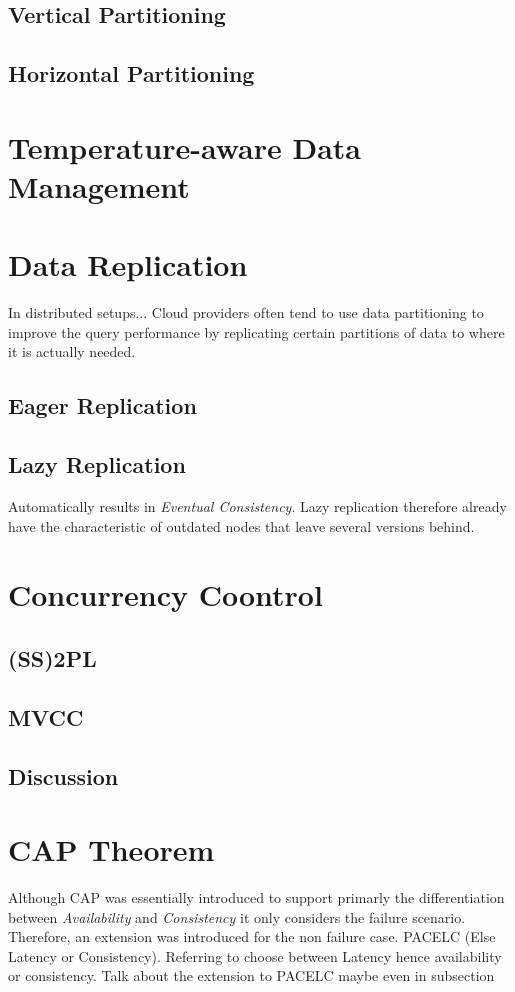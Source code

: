\subsection{Vertical Partitioning}
\subsection{Horizontal Partitioning}

\section{Temperature-aware Data Management}

\section{Data Replication}
In distributed setups...
Cloud providers often tend to use data partitioning to improve the query performance
by replicating certain partitions of data to where it is actually needed\cite{cloudpart_2012}.\\

\subsection{Eager Replication}

\subsection{Lazy Replication}
Automatically results in \emph{Eventual Consistency}. Lazy replication therefore already have the characteristic of outdated nodes that leave several versions behind.

\section{Concurrency Coontrol}
\subsection{(SS)2PL}
\subsection{MVCC}
\subsection{Discussion}

\section{CAP Theorem}

Although CAP was essentially introduced to support primarly the differentiation between \emph{Availability} and \emph{Consistency} it only considers the failure scenario.
Therefore, an extension was introduced for the non failure case.
PACELC (Else Latency or Consistency). Referring to choose between Latency hence availability or consistency. 
Talk about the extension to PACELC maybe even in subsection

